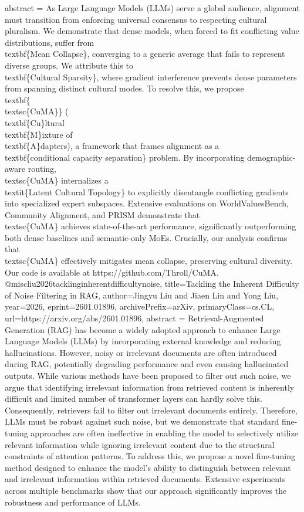 {      abstract = {As Large Language Models (LLMs) serve a global audience, alignment must transition from enforcing universal consensus to respecting cultural pluralism. We demonstrate that dense models, when forced to fit conflicting value distributions, suffer from \\textbf\{Mean Collapse\}, converging to a generic average that fails to represent diverse groups. We attribute this to \\textbf\{Cultural Sparsity\}, where gradient interference prevents dense parameters from spanning distinct cultural modes. To resolve this, we propose \\textbf\{\\textsc\{CuMA\}\} (\\textbf\{Cu\}ltural \\textbf\{M\}ixture of \\textbf\{A\}dapters), a framework that frames alignment as a \\textbf\{conditional capacity separation\} problem. By incorporating demographic-aware routing, \\textsc\{CuMA\} internalizes a \\textit\{Latent Cultural Topology\} to explicitly disentangle conflicting gradients into specialized expert subspaces. Extensive evaluations on WorldValuesBench, Community Alignment, and PRISM demonstrate that \\textsc\{CuMA\} achieves state-of-the-art performance, significantly outperforming both dense baselines and semantic-only MoEs. Crucially, our analysis confirms that \\textsc\{CuMA\} effectively mitigates mean collapse, preserving cultural diversity. Our code is available at https://github.com/Throll/CuMA.}
}@misc{liu2026tacklinginherentdifficultynoise,
      title={Tackling the Inherent Difficulty of Noise Filtering in RAG}, 
      author={Jingyu Liu and Jiaen Lin and Yong Liu},
      year={2026},
      eprint={2601.01896},
      archivePrefix={arXiv},
      primaryClass={cs.CL},
      url={https://arxiv.org/abs/2601.01896},
      abstract = {Retrieval-Augmented Generation (RAG) has become a widely adopted approach to enhance Large Language Models (LLMs) by incorporating external knowledge and reducing hallucinations. However, noisy or irrelevant documents are often introduced during RAG, potentially degrading performance and even causing hallucinated outputs. While various methods have been proposed to filter out such noise, we argue that identifying irrelevant information from retrieved content is inherently difficult and limited number of transformer layers can hardly solve this. Consequently, retrievers fail to filter out irrelevant documents entirely. Therefore, LLMs must be robust against such noise, but we demonstrate that standard fine-tuning approaches are often ineffective in enabling the model to selectively utilize relevant information while ignoring irrelevant content due to the structural constraints of attention patterns. To address this, we propose a novel fine-tuning method designed to enhance the model's ability to distinguish between relevant and irrelevant information within retrieved documents. Extensive experiments across multiple benchmarks show that our approach significantly improves the robustness and performance of LLMs.}
}
